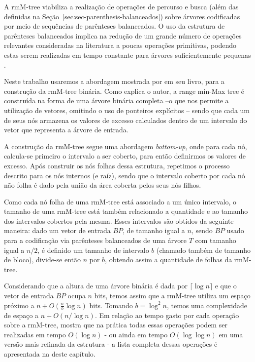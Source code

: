 A rmM-tree viabiliza a realização de operações de percurso e busca (além das definidas na Seção~\ref{sec:sec-parenthesis-balanceados}) sobre árvores codificadas por meio de sequências de parênteses balanceados. O uso da estrutura de parênteses balanceados implica na redução de um grande número de operações relevantes consideradas na literatura a poucas operações primitivas, podendo estas serem realizadas em tempo constante para árvores suficientemente pequenas \citep{paper-fully-functinal-succint-trees}.

Neste trabalho usaremos a abordagem mostrada por \citet{book-compact-data-structures} em seu livro, para a construção da rmM-tree binária. Como explica o autor, a range min-Max tree é construída na forma de uma árvore binária completa --o que nos permite a utilização de vetores, omitindo o uso de ponteiros explícitos -- sendo que cada um de seus nós armazena os valores de excesso calculados dentro de um intervalo do vetor que representa a árvore de entrada. 

A construção da rmM-tree segue uma abordagem \textit{bottom-up}, onde para cada nó, calcula-se primeiro o intervalo a ser coberto, para então definirmos os  valores de excesso. Após construir os nós folhas dessa estrutura, repetimos o processo descrito para os nós internos (e raíz), sendo que o intervalo coberto por cada nó não folha é dado pela união da área coberta pelos seus nós filhos.

Como cada nó folha de uma rmM-tree está associado a um único intervalo, o tamanho de uma rmM-tree está também relacionado a quantidade e ao tamanho dos intervalos cobertos pela mesma. 
Esses intervalos são obtidos da seguinte maneira: dado um vetor de entrada $BP$, de  tamanho igual a $n$, sendo $BP$ usado para a codificação via parênteses balanceados de uma árvore $T$ com tamanho igual a $n/2$, é definido um tamanho de intervalo $b$ (chamado também de tamanho de bloco), divide-se então $n$ por $b$, obtendo assim a quantidade de folhas da rmM-tree.

Considerando que a altura de uma árvore binária é dada por $\lceil \log n \rceil$ e que o vetor de entrada $BP$ ocupa $n$ bits, temos assim que a rmM-tree utiliza um espaço próximo a $n + O(\frac{n}{b} \log n)$ bits. Tomando $b = \log^2 n$, temos uma complexidade de espaço a $n + O(n/\log n)$. Em relação ao tempo gasto por cada operação sobre a rmM-tree,  \citet{book-compact-data-structures} mostra que na prática todas essas operações podem ser realizadas em tempo $O(\log n)$ - ou ainda em tempo $O(\log \log n)$ em uma versão mais refinada da estrutura - a lista completa dessas operações é apresentada na  deste capítulo.


